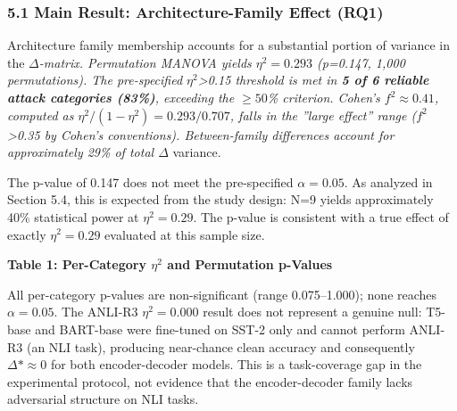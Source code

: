 
\subsubsection{5.1 Main Result: Architecture-Family Effect (RQ1)}

Architecture family membership accounts for a substantial portion of variance in the $\Delta$\textit{-matrix. Permutation MANOVA yields \textbf{$\eta^{2}=0.293$} (p=0.147, 1,000 permutations). The pre-specified $\eta^2$>0.15 threshold is met in \textbf{5 of 6 reliable attack categories (83\%)}, exceeding the $\geq 50$\% criterion. Cohen's $f^{2}\approx 0.41$, computed as $\eta^{2}/(1-\eta^{2})=0.293/0.707$, falls in the ''large effect'' range ($f^2$>0.35 by Cohen's conventions). Between-family differences account for approximately 29\% of total $\Delta$} variance.

The p-value of 0.147 does not meet the pre-specified $\alpha =0.05$. As analyzed in Section 5.4, this is expected from the study design: N=9 yields approximately 40\% statistical power at $\eta^{2}=0.29$. The p-value is consistent with a true effect of exactly $\eta^{2}=0.29$ evaluated at this sample size.

\textbf{Table 1: Per-Category $\eta^2$ and Permutation p-Values}

\begin{table}[htbp]
\centering
{}
\end{table}

All per-category p-values are non-significant (range 0.075--1.000); none reaches $\alpha =0.05$. The ANLI-R3 $\eta^{2}=0.000$ result does not represent a genuine null: T5-base and BART-base were fine-tuned on SST-2 only and cannot perform ANLI-R3 (an NLI task), producing near-chance clean accuracy and consequently $\Delta*\approx 0$ for both encoder-decoder models. This is a task-coverage gap in the experimental protocol, not evidence that the encoder-decoder family lacks adversarial structure on NLI tasks.

